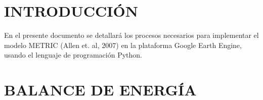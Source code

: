 \chapter{INTRODUCCIÓN}

En el presente documento se detallará los procesos necesarios para implementar el modelo METRIC (Allen et. al, 2007) en la plataforma Google Earth Engine, usando el lenguaje de programación Python.

\chapter{BALANCE DE ENERGÍA}